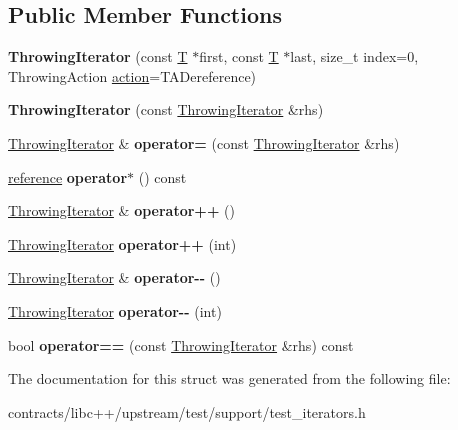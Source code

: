 \subsection*{Public Member Functions}
\begin{DoxyCompactItemize}
\item 
\mbox{\label{struct_throwing_iterator_a61bb54e929aaeb0181d1d884ed6f81db}} 
{\bfseries Throwing\+Iterator} (const \mbox{\hyperlink{struct_t}{T}} $\ast$first, const \mbox{\hyperlink{struct_t}{T}} $\ast$last, size\+\_\+t index=0, Throwing\+Action \mbox{\hyperlink{structaction}{action}}=T\+A\+Dereference)
\item 
\mbox{\label{struct_throwing_iterator_acaea9395347deed96e118627c441c4f1}} 
{\bfseries Throwing\+Iterator} (const \mbox{\hyperlink{struct_throwing_iterator}{Throwing\+Iterator}} \&rhs)
\item 
\mbox{\label{struct_throwing_iterator_a27378770aa1829565fa436da2652edc9}} 
\mbox{\hyperlink{struct_throwing_iterator}{Throwing\+Iterator}} \& {\bfseries operator=} (const \mbox{\hyperlink{struct_throwing_iterator}{Throwing\+Iterator}} \&rhs)
\item 
\mbox{\label{struct_throwing_iterator_ac61d5dcd5d120cf0a5bef53f651eb83e}} 
\mbox{\hyperlink{struct_t}{reference}} {\bfseries operator$\ast$} () const
\item 
\mbox{\label{struct_throwing_iterator_afcddf91981ec573d95cd7fc9524e62b3}} 
\mbox{\hyperlink{struct_throwing_iterator}{Throwing\+Iterator}} \& {\bfseries operator++} ()
\item 
\mbox{\label{struct_throwing_iterator_a97ea39fb3c8765831a539178e38e2222}} 
\mbox{\hyperlink{struct_throwing_iterator}{Throwing\+Iterator}} {\bfseries operator++} (int)
\item 
\mbox{\label{struct_throwing_iterator_a8c9628e8bd43948f4c496a7b447d571a}} 
\mbox{\hyperlink{struct_throwing_iterator}{Throwing\+Iterator}} \& {\bfseries operator-\/-\/} ()
\item 
\mbox{\label{struct_throwing_iterator_afc94301aaae558fb28f98d2eb28bbd03}} 
\mbox{\hyperlink{struct_throwing_iterator}{Throwing\+Iterator}} {\bfseries operator-\/-\/} (int)
\item 
\mbox{\label{struct_throwing_iterator_a20fd7a1b94ce968904d2d56487845a5a}} 
bool {\bfseries operator==} (const \mbox{\hyperlink{struct_throwing_iterator}{Throwing\+Iterator}} \&rhs) const
\end{DoxyCompactItemize}


The documentation for this struct was generated from the following file\+:\begin{DoxyCompactItemize}
\item 
contracts/libc++/upstream/test/support/test\+\_\+iterators.\+h\end{DoxyCompactItemize}
